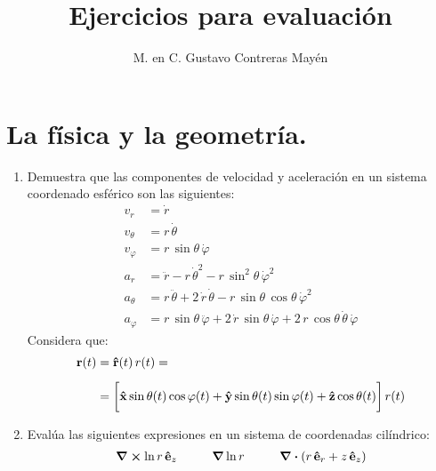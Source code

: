 
\title{Ejercicios para evaluación} \vspace{-3ex}
\author{M. en C. Gustavo Contreras Mayén}
\date{ }
\newcommand{\Cancel}[2][black]{{\color{#1}\cancel{\color{black}#2}}}


\vspace{-4cm}
\maketitle
\fontsize{14}{14}\selectfont

\section{La física y la geometría.}

\begin{enumerate}
\item Demuestra que las componentes de velocidad y aceleración en un sistema coordenado esférico son las siguientes:
\begin{align*}
v_{r} &= \dot{r} \\[0.5em]
v_{\theta} &= r \, \dot{\theta} \\[0.5em]
v_{\varphi} &= r \, \sin \theta \, \dot{\varphi} \\[0.5em]
a_{r} &= \ddot{r} - r \, \dot{\theta}^{2} - r \, \sin^{2} \theta \, \dot{\varphi}^{2} \\[0.5em]
a_{\theta} &= r \, \ddot{\theta} + 2 \, \dot{r} \, \dot{\theta} - r \, \sin \theta \, \cos \theta \, \dot{\varphi}^{2} \\[0.5em]
a_{\varphi} &= r \, \sin \theta \, \ddot{\varphi} + 2 \, \dot{r} \, \sin \theta \, \dot{\varphi} + 2 \, r \, \cos \theta \, \dot{\theta} \, \dot{\varphi}
\end{align*}
Considera que:
\begin{align*}
\vb{r}(t) &= \vu{r}(t) \, r(t) = \\[0.5em]
&= \bigg[ \vu{x} \sin \theta (t) \cos \varphi (t) + \vu{y} \sin \theta (t) \sin \varphi (t) + \vu{z} \cos \theta (t) \bigg] \, r(t)
\end{align*}
\item Evalúa las siguientes expresiones en un sistema de coordenadas cilíndrico:
\begin{align*}
\curl{\ln r \, \vu{e}_{z}} \hspace{1cm} \grad{\ln r} \hspace{1cm} \div{(r \, \vu{e}_{r} + z \, \vu{e}_{z})}

\end{align*}
\end{enumerate}
